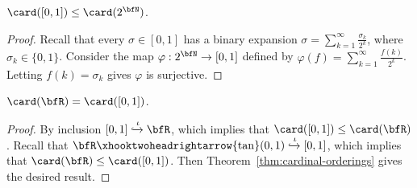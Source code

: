     \begin{lemma}\label{lemma:1}
        $\card([0,1]) \leq \card(2^\bfN)$.
    \end{lemma}
        \begin{proof}
            Recall that every $\sigma \in [0,1]$ has a binary expansion $\sigma = \sum_{k = 1}^\infty \frac{\sigma_k}{2^k}$, where $\sigma_k \in \{0,1\}$. Consider the map $\varphi: 2^\bfN \rightarrow [0,1]$ defined by $\varphi(f) = \sum_{k = 1}^\infty \frac{f(k)}{2^k}$. Letting $f(k) = \sigma_k$ gives $\varphi$ is surjective.
        \end{proof}
    
    \begin{lemma}\label{lemma:2}
        $\card(\bfR) = \card([0,1])$.
    \end{lemma}
        \begin{proof}
            By inclusion $[0,1] \xhookrightarrow{\iota} \bfR$, which implies that $\card([0,1]) \leq \card(\bfR)$. Recall that \newline$\bfR \xhooktwoheadrightarrow{\tan} (0,1) \xhookrightarrow{\iota} [0,1]$, which implies that $\card(\bfR) \leq \card([0,1])$. Then Theorem~\ref{thm:cardinal-orderings} gives the desired result.
        \end{proof}

